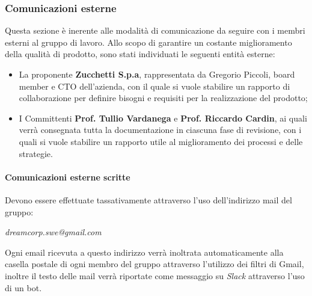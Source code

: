         \subsubsection{Comunicazioni esterne}
            Questa sezione è inerente alle modalità di comunicazione da seguire con i membri esterni al gruppo di lavoro.
            \newline
            Allo scopo di garantire un costante miglioramento della qualità di prodotto, sono stati individuati le seguenti entità esterne:
            \begin{itemize}
                \item La proponente \textbf{Zucchetti S.p.a}, rappresentata da Gregorio Piccoli, board member e CTO dell'azienda, con il quale si vuole stabilire un rapporto di collaborazione per definire bisogni e requisiti per la realizzazione del prodotto;
                \item I Committenti \textbf{Prof. Tullio Vardanega} e \textbf{Prof. Riccardo Cardin}, ai quali verrà consegnata tutta la documentazione in ciascuna fase di revisione, con i quali si vuole stabilire un rapporto utile al miglioramento dei processi e delle strategie.
            \end{itemize}
            \paragraph{Comunicazioni esterne scritte} Devono essere effettuate tassativamente attraverso l'uso dell'indirizzo mail del gruppo:
            \newline
            \begin{center}
            	\textit{dreamcorp.swe@gmail.com}
            \end{center}
            
Ogni email ricevuta a questo indirizzo verrà inoltrata automaticamente alla casella postale di ogni membro del gruppo attraverso l'utilizzo dei filtri di Gmail\pedice, inoltre il testo delle mail verrà riportate come messaggio su \textit{Slack} attraverso l'uso di un bot.
